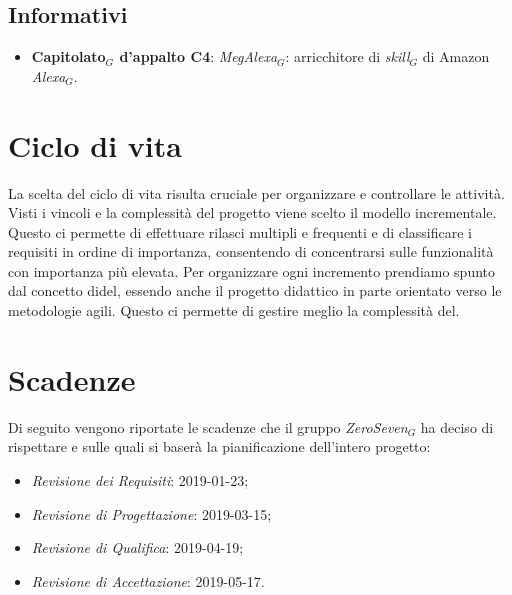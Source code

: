 \subsection{Informativi}
\begin{itemize}
	\item \textbf{Capitolato$_{G}$ d'appalto C4}: \textit{MegAlexa$_{G}$}: arricchitore di \textit{skill$_{G}$} di Amazon \textit{Alexa$_{G}$}.
\end{itemize}
\section{Ciclo di vita}
La scelta del ciclo di vita risulta cruciale per organizzare e controllare le attività. Visti i vincoli e la complessità del progetto viene scelto il modello incrementale. Questo ci permette di effettuare rilasci multipli e frequenti e di classificare i requisiti in ordine di importanza, consentendo di concentrarsi sulle funzionalità con importanza più elevata. Per organizzare ogni incremento prendiamo spunto dal concetto didel, essendo anche il progetto didattico in parte orientato verso le metodologie agili. Questo ci permette di gestire meglio la complessità del.
\section{Scadenze}
Di seguito vengono riportate le scadenze che il gruppo \textit{ZeroSeven$_{G}$} ha deciso di rispettare e sulle quali si baserà la pianificazione dell'intero progetto:
\begin{itemize}
	\item \textit{Revisione dei Requisiti}: 2019-01-23;
	\item \textit{Revisione di Progettazione}: 2019-03-15;
	\item \textit{Revisione di Qualifica}: 2019-04-19;
	\item \textit{Revisione di Accettazione}: 2019-05-17.
\end{itemize}